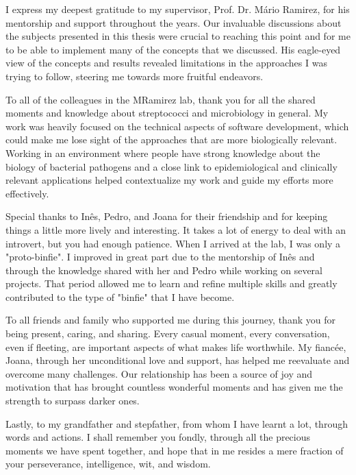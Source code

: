 I express my deepest gratitude to my supervisor, Prof. Dr. Mário Ramirez, for his mentorship and support throughout the years. Our invaluable discussions about the subjects presented in this thesis were crucial to reaching this point and for me to be able to implement many of the concepts that we discussed. His eagle-eyed view of the concepts and results revealed limitations in the approaches I was trying to follow, steering me towards more fruitful endeavors.

To all of the colleagues in the MRamirez lab, thank you for all the shared moments and knowledge about streptococci and microbiology in general. My work was heavily focused on the technical aspects of software development, which could make me lose sight of the approaches that are more biologically relevant. Working in an environment where people have strong knowledge about the biology of bacterial pathogens and a close link to epidemiological and clinically relevant applications helped contextualize my work and guide my efforts more effectively.

Special thanks to Inês, Pedro, and Joana for their friendship and for keeping things a little more lively and interesting. It takes a lot of energy to deal with an introvert, but you had enough patience. When I arrived at the lab, I was only a "proto-binfie". I improved in great part due to the mentorship of Inês and through the knowledge shared with her and Pedro while working on several projects. That period allowed me to learn and refine multiple skills and greatly contributed to the type of "binfie" that I have become.

To all friends and family who supported me during this journey, thank you for being present, caring, and sharing. Every casual moment, every conversation, even if fleeting, are important aspects of what makes life worthwhile. My fiancée, Joana, through her unconditional love and support, has helped me reevaluate and overcome many challenges. Our relationship has been a source of joy and motivation that has brought countless wonderful moments and has given me the strength to surpass darker ones.

Lastly, to my grandfather and stepfather, from whom I have learnt a lot, through words and actions. I shall remember you fondly, through all the precious moments we have spent together, and hope that in me resides a mere fraction of your perseverance, intelligence, wit, and wisdom.
